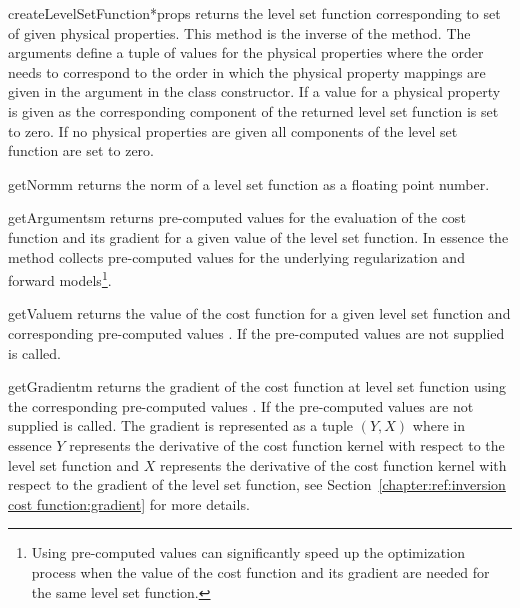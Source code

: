\begin{methoddesc}[InversionCostFunction]{createLevelSetFunction}{*props}
returns the level set function corresponding to set of given physical properties.
This method is the inverse of the  method.
The arguments  define a tuple of values for the physical
properties where the order needs to correspond to the order in which the
physical property mappings are given in the  argument in the
class constructor. If a value for a physical property is given as \None the
corresponding component of the returned level set function is set to zero.
If no physical properties are given all components of the level set function
are set to zero.
\end{methoddesc}
    
\begin{methoddesc}[InversionCostFunction]{getNorm}{m}
returns the norm of a level set function  as a floating point number.
\end{methoddesc}

\begin{methoddesc}[InversionCostFunction]{getArguments}{m}
returns pre-computed values for the evaluation of the cost function and its
gradient for a given value  of the level set function.
In essence the method collects pre-computed values for the underlying
regularization and forward models\footnote{Using pre-computed values can
significantly speed up the optimization process when the value of the cost
function and its gradient are needed for the same level set function.}.
\end{methoddesc}

\begin{methoddesc}[InversionCostFunction]{getValue}{m}
returns the value of the cost function for a given level set function 
and corresponding pre-computed values .
If the pre-computed values are not supplied  is called.
\end{methoddesc}

\begin{methoddesc}[InversionCostFunction]{getGradient}{m}
returns the gradient of the cost function at level set function 
using the corresponding pre-computed values .
If the pre-computed values are not supplied  is called.
The gradient is represented as a tuple $(Y,X)$ where in essence $Y$ represents
the derivative of the cost function kernel with respect to the level set
function and $X$ represents the derivative of the cost function kernel with
respect to the gradient of the level set function, see
Section~\ref{chapter:ref:inversion cost function:gradient} for more details.
\end{methoddesc}
       
